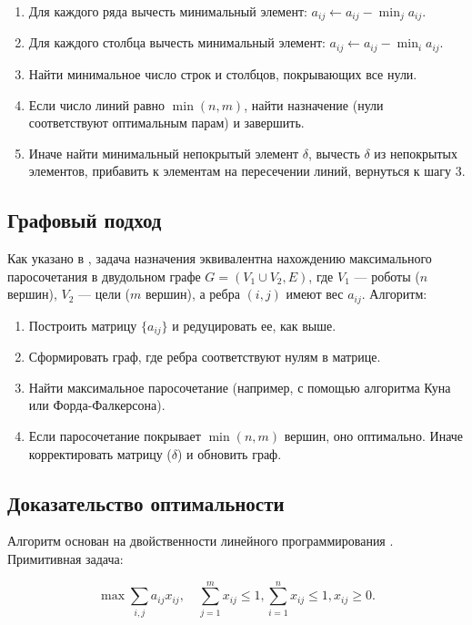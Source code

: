 \begin{enumerate}
    \item Для каждого ряда вычесть минимальный элемент: \( a_{ij} \gets a_{ij} - \min_j a_{ij} \).
    \item Для каждого столбца вычесть минимальный элемент: \( a_{ij} \gets a_{ij} - \min_i a_{ij} \).
    \item Найти минимальное число строк и столбцов, покрывающих все нули.
    \item Если число линий равно \( \min(n, m) \), найти назначение (нули соответствуют оптимальным парам) и завершить.
    \item Иначе найти минимальный непокрытый элемент \( \delta \), вычесть \( \delta \) из непокрытых элементов, прибавить к элементам на пересечении линий, вернуться к шагу 3.
\end{enumerate}

\subsection{Графовый подход}
Как указано в \cite{emaxx2025}, задача назначения эквивалентна нахождению максимального паросочетания в двудольном графе \( G = (V_1 \cup V_2, E) \), где \( V_1 \) --- роботы (\( n \) вершин), \( V_2 \) --- цели (\( m \) вершин), а ребра \( (i,j) \) имеют вес \( a_{ij} \). Алгоритм:

\begin{enumerate}
    \item Построить матрицу \( \{a_{ij}\} \) и редуцировать ее, как выше.
    \item Сформировать граф, где ребра соответствуют нулям в матрице.
    \item Найти максимальное паросочетание (например, с помощью алгоритма Куна или Форда-Фалкерсона).
    \item Если паросочетание покрывает \( \min(n, m) \) вершин, оно оптимально. Иначе корректировать матрицу (\( \delta \)) и обновить граф.
\end{enumerate}

\subsection{Доказательство оптимальности}
Алгоритм основан на двойственности линейного программирования \cite{kuhn1955}. Примитивная задача:

\[
\max \sum_{i,j} a_{ij} x_{ij}, \quad \sum_{j=1}^m x_{ij} \leq 1, \sum_{i=1}^n x_{ij} \leq 1, x_{ij} \geq 0.
\]

